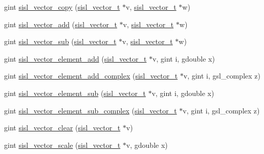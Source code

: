 \begin{DoxyCompactItemize}
\item 
gint \hyperlink{group__vector_ga782dc0e416aadf242dc5c06d5c078347}{sisl\-\_\-vector\-\_\-copy} (\hyperlink{group__vector_gacbac585492f5005f05f0c0b8463039be}{sisl\-\_\-vector\-\_\-t} $\ast$v, \hyperlink{group__vector_gacbac585492f5005f05f0c0b8463039be}{sisl\-\_\-vector\-\_\-t} $\ast$w)
\item 
gint \hyperlink{group__vector_ga95c714975c15dc45106e0b46d698686f}{sisl\-\_\-vector\-\_\-add} (\hyperlink{group__vector_gacbac585492f5005f05f0c0b8463039be}{sisl\-\_\-vector\-\_\-t} $\ast$v, \hyperlink{group__vector_gacbac585492f5005f05f0c0b8463039be}{sisl\-\_\-vector\-\_\-t} $\ast$w)
\item 
gint \hyperlink{group__vector_ga9232cbb2dbb276abbbc39afe02d939f5}{sisl\-\_\-vector\-\_\-sub} (\hyperlink{group__vector_gacbac585492f5005f05f0c0b8463039be}{sisl\-\_\-vector\-\_\-t} $\ast$v, \hyperlink{group__vector_gacbac585492f5005f05f0c0b8463039be}{sisl\-\_\-vector\-\_\-t} $\ast$w)
\item 
gint \hyperlink{group__vector_ga60a3b5d4b7639a5b51fbb2a7d09f4b79}{sisl\-\_\-vector\-\_\-element\-\_\-add} (\hyperlink{group__vector_gacbac585492f5005f05f0c0b8463039be}{sisl\-\_\-vector\-\_\-t} $\ast$v, gint i, gdouble x)
\item 
gint \hyperlink{group__vector_ga1314197af0655485fe81bbd14e92482b}{sisl\-\_\-vector\-\_\-element\-\_\-add\-\_\-complex} (\hyperlink{group__vector_gacbac585492f5005f05f0c0b8463039be}{sisl\-\_\-vector\-\_\-t} $\ast$v, gint i, gsl\-\_\-complex z)
\item 
gint \hyperlink{group__vector_gab178a51567a77d4b40e23ab0511aa2ee}{sisl\-\_\-vector\-\_\-element\-\_\-sub} (\hyperlink{group__vector_gacbac585492f5005f05f0c0b8463039be}{sisl\-\_\-vector\-\_\-t} $\ast$v, gint i, gdouble x)
\item 
gint \hyperlink{group__vector_gaab6e862963fb72b8578a56973094ef76}{sisl\-\_\-vector\-\_\-element\-\_\-sub\-\_\-complex} (\hyperlink{group__vector_gacbac585492f5005f05f0c0b8463039be}{sisl\-\_\-vector\-\_\-t} $\ast$v, gint i, gsl\-\_\-complex z)
\item 
gint \hyperlink{group__vector_gac61e04a39ddbc2f6c14ebba09787e7b3}{sisl\-\_\-vector\-\_\-clear} (\hyperlink{group__vector_gacbac585492f5005f05f0c0b8463039be}{sisl\-\_\-vector\-\_\-t} $\ast$v)
\item 
gint \hyperlink{group__vector_gae10dd87e1006defb6e54392f8ef9e1e5}{sisl\-\_\-vector\-\_\-scale} (\hyperlink{group__vector_gacbac585492f5005f05f0c0b8463039be}{sisl\-\_\-vector\-\_\-t} $\ast$v, gdouble x)
\item 

\end{DoxyCompactItemize}
